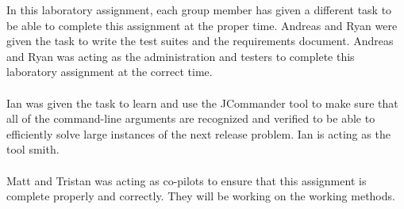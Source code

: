 \documentclass{article}
\begin{document}
In this laboratory assignment, each group member has given a different task to be able to complete this assignment at the proper time. Andreas and Ryan were given the task to write the test suites and the requirements document. Andreas and Ryan was acting as the administration and testers to complete this laboratory assignment at the correct time.
\\
\\
Ian was given the task to learn and use the JCommander tool to make sure that all of the command-line arguments are recognized and verified to be able to efficiently solve large instances of the next release problem. Ian is acting as the tool smith.
\\
\\
Matt and Tristan was acting as co-pilots to ensure that this assignment is complete properly and correctly. They will be working on the working methods. 
\end{document}
